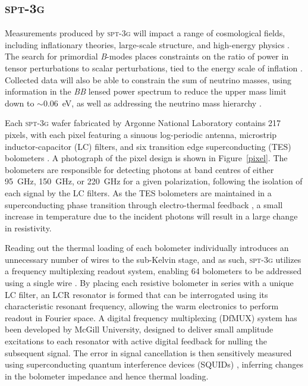 \documentclass[preprint]{aastex}
\begin{document}
\subsection{\textsc{spt-3g}}
Measurements produced by \textsc{spt-3g} will impact a range of cosmological fields, including inflationary theories, large-scale structure, and high-energy physics \citep{benson_spt-3g:_2014}.  The search for primordial \textit{B}-modes places constraints on the ratio of power in tensor perturbations to scalar perturbations, tied to the energy scale of inflation \citep{samtleben_cosmic_2007}.  Collected data will also be able to constrain the sum of neutrino masses, using information in the \textit{BB} lensed power spectrum to reduce the upper mass limit down to $\sim$0.06~eV, as well as addressing the neutrino mass hierarchy \citep{benson_spt-3g:_2014}.

Each \textsc{spt-3g} wafer fabricated by Argonne National Laboratory contains 217 pixels, with each pixel featuring a sinuous log-periodic antenna, microstrip inductor-capacitor (LC) filters, and six transition edge superconducting (TES) bolometers \citep{benson_spt-3g:_2014}.  A photograph of the pixel design is shown in Figure~\ref{pixel}.  The bolometers are responsible for detecting photons at band centres of either 95~GHz, 150~GHz, or 220~GHz for a given polarization, following the isolation of each signal by the LC filters.  As the TES bolometers are maintained in a superconducting phase transition through electro-thermal feedback \citep{benson_spt-3g:_2014}, a small increase in temperature due to the incident photons will result in a large change in resistivity.

Reading out the thermal loading of each bolometer individually introduces an unnecessary number of wires to the sub-Kelvin stage, and as such, \textsc{spt-3g} utilizes a frequency multiplexing readout system, enabling 64 bolometers to be addressed using a single wire \citep{dobbs_frequency_2012}.  By placing each resistive bolometer in series with a unique LC filter, an LCR resonator is formed \citep{henning_feedhorn-coupled_2012} that can be interrogated using its characteristic resonant frequency, allowing the warm electronics to perform readout in Fourier space.  A digital frequency multiplexing (DfMUX) \citep{dobbs_frequency_2012} system has been developed by McGill University, designed to deliver small amplitude excitations to each resonator with active digital feedback for nulling the subsequent signal.  The error in signal cancellation is then sensitively measured using superconducting quantum interference devices (SQUIDs) \citep{dobbs_frequency_2012}, inferring changes in the bolometer impedance and hence thermal loading.
\end{document}
